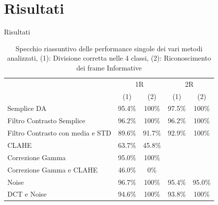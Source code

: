 \documentclass[aspectratio=169]{beamer}
\begin{document}
\section{Risultati}
\begin{frame}{Risultati}
    \begin{table}[H]
        \centering
        \begin{tabular}{l|cc|cc}
                                         & \multicolumn{2}{c|}{1R}                                                   & \multicolumn{2}{c}{2R}                                                   \\
                                         & (1) & (2) & (1) & (2) \\ \midrule
        Semplice DA                      & 95.4\%                            & 100\%                                & 97.5\%                            & 100\%                                \\
        Filtro Contrasto Semplice        & 96.2\%                            & 100\%                                & 96.2\%                            & 100\%                                \\
        Filtro Contrasto con media e STD & 89.6\%                            & 91.7\%                               & 92.9\%                            & 100\%                                \\
        CLAHE                            & 63.7\%                            & 45.8\%                               &                                   &                                      \\
        Correzione Gamma                 & 95.0\%                            & 100\%                                &                                   &                                      \\
        Correzione Gamma e CLAHE         & 46.0\%                            & 0\%                                  &                                   &                                      \\
        Noise                            & 96.7\%                            & 100\%                                & 95.4\%                            & 95.0\%                               \\
        DCT e Noise                      & 94.6\%                            & 100\%                                & 93.8\%                            & 100\%                             
        \end{tabular}
        \caption[Specchio riassuntivo delle performance singole dei vari metodi analizzati]{Specchio riassuntivo delle performance singole dei vari metodi analizzati, (1): Divisione corretta nelle 4 classi, (2): Riconoscimento dei frame Informative}
        \label{tab:specchio-single}
    \end{table}
\end{frame}
\end{document}
